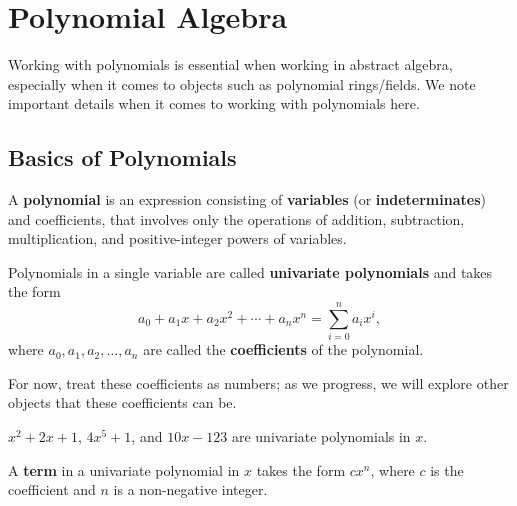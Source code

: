 \chapter{Polynomial Algebra}
Working with polynomials is essential when working in abstract algebra, especially when it comes to objects such as polynomial rings/fields. We note important details when it comes to working with polynomials here.

\section{Basics of Polynomials}
\begin{definition}
    A \textbf{polynomial} is an expression consisting of \textbf{variables} (or \textbf{indeterminates}) and coefficients, that involves only the operations of addition, subtraction, multiplication, and positive-integer powers of variables.
\end{definition}
\begin{definition}
    Polynomials in a single variable are called \textbf{univariate polynomials} and takes the form
    \[
        a_0+a_1x+a_2x^2+\cdots+a_nx^n = \sum_{i=0}^n a_ix^i,
    \]
    where $a_0, a_1, a_2, \dots, a_n$ are called the \textbf{coefficients} of the polynomial.
\end{definition}
\begin{remark}
    For now, treat these coefficients as numbers; as we progress, we will explore other objects that these coefficients can be.
\end{remark}
\begin{example}
    $x^2 + 2x + 1$, $4x^5 + 1$, and $10x-123$ are univariate polynomials in $x$.
\end{example}
\begin{definition}
    A \textbf{term} in a univariate polynomial in $x$ takes the form $cx^n$, where $c$ is the coefficient and $n$ is a non-negative integer.
\end{definition}

